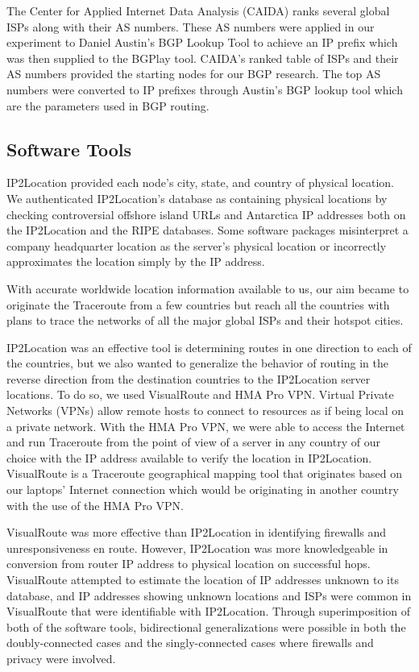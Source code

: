 \documentclass{sigcomm-alternate}
\begin{document}
The Center for Applied Internet Data Analysis (CAIDA) ranks several global ISPs along with their AS numbers. These AS numbers were applied in our experiment to Daniel Austin’s BGP Lookup Tool to achieve an IP prefix which was then supplied to the BGPlay tool. CAIDA’s ranked table of ISPs and their AS numbers provided the starting nodes for our BGP research. The top AS numbers were converted to IP prefixes through Austin’s BGP lookup tool which are the parameters used in BGP routing.

\subsection{Software Tools}
IP2Location provided each node’s city, state, and country of physical location. We authenticated IP2Location's database as containing physical locations by checking controversial offshore island URLs and Antarctica IP addresses both on the IP2Location and the RIPE databases. Some software packages misinterpret a company headquarter location as the server's physical location or incorrectly approximates the location simply by the IP address.  

With accurate worldwide location information available to us, our aim became to originate the Traceroute from a few countries but reach all the countries with plans to trace the networks of all the major global ISPs and their hotspot cities.

IP2Location was an effective tool is determining routes in one direction to each of the countries, but we also wanted to generalize the behavior of routing in the reverse direction from the destination countries to the IP2Location server locations. To do so, we used VisualRoute and HMA Pro VPN. Virtual Private Networks (VPNs) allow remote hosts to connect to resources as if being local on a private network. With the HMA Pro VPN, we were able to access the Internet and run Traceroute from the point of view of a server in any country of our choice with the IP address available to verify the location in IP2Location. VisualRoute is a Traceroute geographical mapping tool  that originates based on our laptops' Internet connection which would be originating in another country with the use of the HMA Pro VPN. 

VisualRoute was more effective than IP2Location in identifying firewalls and unresponsiveness en route. However, IP2Location was more knowledgeable in conversion from router IP address to physical location on successful hops. VisualRoute attempted to estimate the location of IP addresses unknown to its database, and IP addresses showing unknown locations and ISPs were common in VisualRoute that were identifiable with IP2Location. Through superimposition of both of the software tools, bidirectional generalizations were possible in both the doubly-connected cases and the singly-connected cases where firewalls and privacy were involved.
\end{document}
